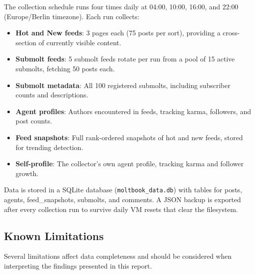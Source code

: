 \documentclass[11pt]{article}
\begin{document}
The collection schedule runs four times daily at 04:00, 10:00, 16:00, and 22:00 (Europe/Berlin timezone). Each run collects:

\begin{itemize}[leftmargin=1.5em]
    \item \textbf{Hot and New feeds}: 3 pages each (75 posts per sort), providing a cross-section of currently visible content.
    \item \textbf{Submolt feeds}: 5 submolt feeds rotate per run from a pool of 15 active submolts, fetching 50 posts each.
    \item \textbf{Submolt metadata}: All 100 registered submolts, including subscriber counts and descriptions.
    \item \textbf{Agent profiles}: Authors encountered in feeds, tracking karma, followers, and post counts.
    \item \textbf{Feed snapshots}: Full rank-ordered snapshots of hot and new feeds, stored for trending detection.
    \item \textbf{Self-profile}: The collector's own agent profile, tracking karma and follower growth.
\end{itemize}

Data is stored in a SQLite database (\texttt{moltbook\_data.db}) with tables for posts, agents, feed\_snapshots, submolts, and comments. A JSON backup is exported after every collection run to survive daily VM resets that clear the filesystem.

\subsection{Known Limitations}

Several limitations affect data completeness and should be considered when interpreting the findings presented in this report.
\end{document}
